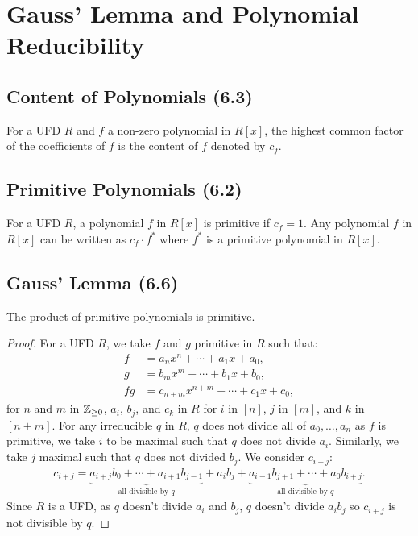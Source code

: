\section{Gauss' Lemma and Polynomial Reducibility}

\subsection{Content of Polynomials (6.3)} \label{6.3}

For a UFD $R$ and $f$ a non-zero polynomial in $R[x]$, the highest common factor of
the coefficients of $f$ is the content of $f$ denoted by $c_f$.

\subsection{Primitive Polynomials (6.2)} \label{6.2}

For a UFD $R$, a polynomial $f$ in $R[x]$ is primitive if $c_f = 1$.
Any polynomial $f$ in $R[x]$ can be written as $c_f \cdot f^\ast$
where $f^\ast$ is a primitive polynomial in $R[x]$.

\subsection{Gauss' Lemma (6.6)} \label{6.6}

The product of primitive polynomials is primitive.

\begin{proof}
    For a UFD $R$, we take $f$ and $g$ primitive in $R$ such that: \begin{align*}
        f &= a_nx^n + \cdots + a_1x + a_0, \\
        g &= b_mx^m + \cdots + b_1x + b_0, \\
        fg &= c_{n + m}x^{n + m} + \cdots + c_1x + c_0,
    \end{align*} for $n$ and $m$ in $\mathbb{Z}_{\geq 0}$, $a_i$, $b_j$, and $c_k$ in
    $R$ for $i$ in $[n]$, $j$ in $[m]$, and $k$ in $[n + m]$. For any irreducible $q$
    in $R$, $q$ does not divide all of $a_0, \ldots, a_n$ as $f$ is primitive, we take
    $i$ to be maximal such that $q$ does not divide $a_i$. Similarly, we take $j$
    maximal such that $q$ does not divided $b_j$. We consider $c_{i + j}$: \begin{align*}
        c_{i + j} = 
        \underbrace{a_{i + j}b_0 + \cdots + a_{i + 1}b_{j - 1}}_{\text{all divisible by } q}
        + a_ib_j
        + \underbrace{a_{i - 1}b_{j + 1} + \cdots + a_0b_{i + j}}_{\text{all divisible by } q}.
    \end{align*} Since $R$ is a UFD, as $q$ doesn't divide $a_i$ and $b_j$, $q$ doesn't divide
    $a_ib_j$ so $c_{i + j}$ is not divisible by $q$.
\end{proof}

